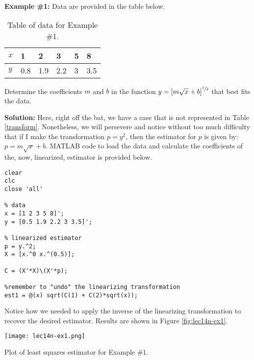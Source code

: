 \vspace{3.5cm}

\noindent \textbf{Example \#1:} Data are provided in the table below.
\begin{table}
\begin{tabular}{|l|l|l|l|l|l|}
\hline
$x$ & 1 & 2 & 3 & 5 & 8 \\ \hline
$y$ & 0.8 & 1.9 & 2.2 & 3 & 3.5 \\ \hline 
\end{tabular}
\caption{Table of data for Example \#1.}
\label{tab:lec14n-ex1}
\end{table}

\vspace{0.2cm}

\noindent Determine the coefficients $m$ and $b$ in the function $y=\left[m\sqrt{x} + b\right]^{\sfrac{1}{2}}$ that best fits the data.  

\vspace{0.2cm}


\noindent \textbf{Solution: }Here, right off the bat, we have a case that is not represented in Table \ref{transform}.  Nonetheless, we will persevere and notice without too much difficulty that if I make the transformation $p = y^2$, then the estimator for $p$ is given by: $p = m\sqrt{x} + b$.  MATLAB code to load the data and calculate the coefficients of the, now, linearized, estimator is provided below.
\begin{lstlisting}[style=myMatlab]
clear
clc
close 'all'

% data
x = [1 2 3 5 8]';
y = [0.5 1.9 2.2 3 3.5]';

% linearized estimator
p = y.^2;
X = [x.^0 x.^(0.5)];

C = (X'*X)\(X'*p);

%remember to "undo" the linearizing transformation
est1 = @(x) sqrt(C(1) + C(2)*sqrt(x));
\end{lstlisting}
Notice how we needed to apply the inverse of the linearizing transformation to recover the desired estimator.  Results are shown in Figure \ref{fig:lec14n-ex1}.
\begin{marginfigure}[-4cm]
\texttt{[image: lec14n-ex1.png]}
\caption{Plot of least squares estimator for Example \#1.}
\label{fig:lec14n-ex1}
\end{marginfigure}


